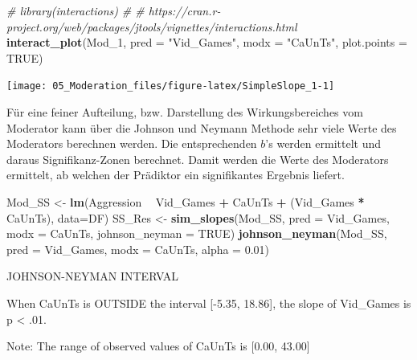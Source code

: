 \documentclass[]{article}
\newenvironment{Shaded}{\begin{snugshade}}{\end{snugshade}}
\newcommand{\CommentTok}[1]{\textcolor[rgb]{0.56,0.35,0.01}{\textit{#1}}}
\newcommand{\DataTypeTok}[1]{\textcolor[rgb]{0.13,0.29,0.53}{#1}}
\newcommand{\DecValTok}[1]{\textcolor[rgb]{0.00,0.00,0.81}{#1}}
\newcommand{\FloatTok}[1]{\textcolor[rgb]{0.00,0.00,0.81}{#1}}
\newcommand{\KeywordTok}[1]{\textcolor[rgb]{0.13,0.29,0.53}{\textbf{#1}}}
\newcommand{\NormalTok}[1]{#1}
\newcommand{\OperatorTok}[1]{\textcolor[rgb]{0.81,0.36,0.00}{\textbf{#1}}}
\newcommand{\OtherTok}[1]{\textcolor[rgb]{0.56,0.35,0.01}{#1}}
\newcommand{\StringTok}[1]{\textcolor[rgb]{0.31,0.60,0.02}{#1}}
\begin{document}
\begin{Shaded}
\begin{Highlighting}[]
    \CommentTok{# library(interactions)}
    \CommentTok{# # https://cran.r-project.org/web/packages/jtools/vignettes/interactions.html}
    \KeywordTok{interact_plot}\NormalTok{(Mod_}\DecValTok{1}\NormalTok{,}
                  \DataTypeTok{pred =} \StringTok{"Vid_Games"}\NormalTok{,}
                  \DataTypeTok{modx =} \StringTok{"CaUnTs"}\NormalTok{,}
                  \DataTypeTok{plot.points =} \OtherTok{TRUE}\NormalTok{)}
\end{Highlighting}
\end{Shaded}

\begin{center}\texttt{[image: 05\_Moderation\_files/figure-latex/SimpleSlope\_1-1]} \end{center}

Für eine feiner Aufteilung, bzw. Darstellung des Wirkungsbereiches vom Moderator kann über die Johnson und Neymann Methode sehr viele Werte des Moderators berechnen werden. Die entsprechenden \(b\)'s werden ermittelt und daraus Signifikanz-Zonen berechnet. Damit werden die Werte des Moderators ermittelt, ab welchen der Prädiktor ein signifikantes Ergebnis liefert.

\begin{Shaded}
\begin{Highlighting}[]
\NormalTok{    Mod_SS <-}\StringTok{ }\KeywordTok{lm}\NormalTok{(Aggression }\OperatorTok{~}\StringTok{ }\NormalTok{Vid_Games }\OperatorTok{+}\StringTok{ }\NormalTok{CaUnTs }\OperatorTok{+}\StringTok{ }\NormalTok{(Vid_Games }\OperatorTok{*}\StringTok{ }\NormalTok{CaUnTs), }\DataTypeTok{data=}\NormalTok{DF)}
\NormalTok{    SS_Res <-}\StringTok{ }\KeywordTok{sim_slopes}\NormalTok{(Mod_SS, }\DataTypeTok{pred =}\NormalTok{ Vid_Games, }\DataTypeTok{modx =}\NormalTok{ CaUnTs, }\DataTypeTok{johnson_neyman =} \OtherTok{TRUE}\NormalTok{)    }
    \KeywordTok{johnson_neyman}\NormalTok{(Mod_SS, }\DataTypeTok{pred =}\NormalTok{ Vid_Games, }\DataTypeTok{modx =}\NormalTok{ CaUnTs, }\DataTypeTok{alpha =} \FloatTok{0.01}\NormalTok{)}
\end{Highlighting}
\end{Shaded}

JOHNSON-NEYMAN INTERVAL

When CaUnTs is OUTSIDE the interval {[}-5.35, 18.86{]}, the slope of
Vid\_Games is p \textless{} .01.

Note: The range of observed values of CaUnTs is {[}0.00, 43.00{]}
\end{document}
